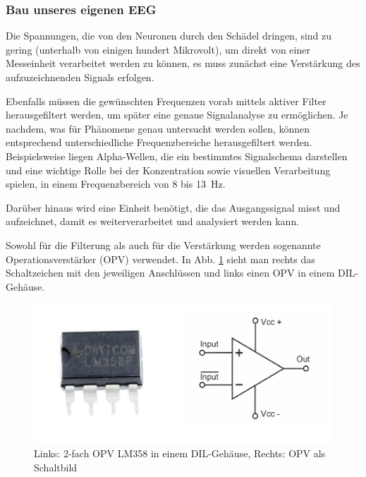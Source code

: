 \documentclass[10pt]{article}
\begin{document}
\subsubsection{Bau unseres eigenen EEG}
 
 Die Spannungen, die von den Neuronen durch den Schädel dringen, sind zu gering (unterhalb von einigen hundert Mikrovolt), um direkt von einer Messeinheit verarbeitet werden zu können, es muss zunächst eine Verstärkung des aufzuzeichnenden Signals erfolgen. \cite{EEGHausarbeit}
 
 Ebenfalls müssen die gewünschten Frequenzen vorab mittels aktiver Filter herausgefiltert werden, um später eine genaue Signalanalyse zu ermöglichen. 
 Je nachdem, was für Phänomene genau untersucht werden sollen, können entsprechend unterschiedliche Frequenzbereiche herausgefiltert werden. 
 Beispielsweise liegen Alpha-Wellen, die ein bestimmtes Signalschema darstellen und eine wichtige Rolle bei der Konzentration sowie visuellen Verarbeitung spielen, in einem Frequenzbereich von 8 bis 13 Hz. \cite{Praktikum, Birbaumer2010, wiki:Berger-Effekt}
 
 Darüber hinaus wird eine Einheit benötigt, die das Ausgangssignal misst und aufzeichnet, damit es weiterverarbeitet und analysiert werden kann. 
 
 Sowohl für die Filterung als auch für die Verstärkung werden sogenannte Operationsverstärker (OPV) verwendet. 
 In Abb. \ref{fig:OPV} sieht man rechts das Schaltzeichen mit den jeweiligen Anschlüssen und links einen OPV in einem DIL-Gehäuse. 
 
 \begin{figure}[h!]
   \centering
    \includegraphics[width=0.7\linewidth]{pictures/OPV.png}
    \caption{Links: 2-fach OPV LM358 in einem DIL-Gehäuse, Rechts: OPV als Schaltbild }
    \label{fig:OPV}
\end{figure}
\end{document}
